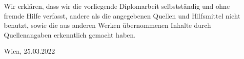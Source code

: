 Wir erklären, dass wir die vorliegende Diplomarbeit selbstständig und ohne fremde Hilfe verfasst, andere als die angegebenen Quellen und Hilfsmittel nicht benutzt, sowie die aus anderen Werken übernommenen Inhalte durch Quellenangaben erkenntlich gemacht haben.




Wien, 25.03.2022

